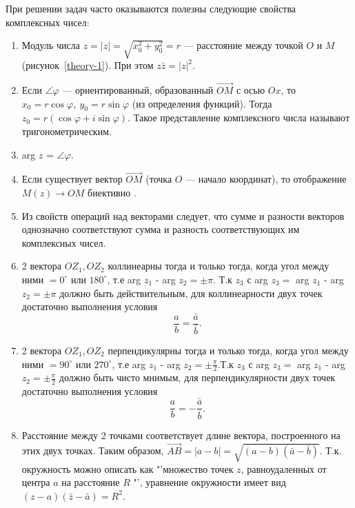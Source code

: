 При решении задач часто оказываются полезны следующие свойства комплексных чисел:
\begin{enumerate}
   \item Модуль числа $z = \vert z\vert = \sqrt{x_0^2+y_0^2} = r$ --- расстояние между точкой
         \(O\) и \(M\) (рисунок~\ref{theory-1}). При этом \(z\bar{z} = |z|^2\).
   \item Если $\angle \varphi$ --- ориентированный, образованный $\overrightarrow{OM}$
         с осью \(Ox\), то $x_0 = r\cos \varphi,~y_0 = r\sin \varphi$ (из определения функций).
         Тогда $z_0 = r(\cos \varphi + i \sin \varphi)$. Такое представление комплексного
         числа называют тригонометрическим.
   \item arg $z$ = $\angle \varphi$.
   \item Если существует вектор \(\overrightarrow{OM}\) (точка \(O\) --- начало координат),
         то отображение \(M(z) \rightarrow OM\) биективно \cite[с. 32]{book:jaglom}.
   \item Из свойств операций над векторами следует, что сумме и разности векторов однозначно
         соответствуют сумма и разность соответствующих им комплексных чисел.
   \item 2 вектора \(OZ_1,OZ_2\) коллинеарны тогда и только тогда, когда угол между ними \(= 0^\circ\)
         или \(180^\circ\), т.е arg \(z_1\) - arg \(z_2 = \pm \pi\). Т.к \(z_3\) с
         arg \(z_3 =\) arg \(z_1\) - arg \(z_2 = \pm \pi\) должно быть действительным, для
         коллинеарности двух точек достаточно выполнения условия
         \begin{equation*}
            \frac{a}{b} = \frac{\bar{a}}{\bar{b}}.
         \end{equation*}
   \item 2 вектора \(OZ_1,OZ_2\) перпендикулярны тогда и только тогда, когда угол между ними
         \(= 90^\circ\) или \(270^\circ\), т.е arg \(z_1\) - arg \(z_2 = \pm \frac{\pi}{2}\).Т.к \(z_3\) с
         arg \(z_3 =\) arg \(z_1\) - arg \(z_2 = \pm \frac{\pi}{2}\) должно быть чисто мнимым,
         для перпендикулярности двух точек достаточно выполнения условия
         \begin{equation*}
            \frac{a}{b} = -\frac{\bar{a}}{\bar{b}}.
         \end{equation*}
   \item Расстояние между 2 точками соответствует длине вектора, построенного на этих двух
         точках. Таким образом, \(\overrightarrow{AB} = |a-b| = \sqrt{(a-b)(\bar{a}-\bar{b})}\). Т.к. окружность
         можно описать как "'множество точек \(z\), равноудаленных от центра \(a\) на расстояние \(R\) "',
         уравнение окружности имеет вид \((z-a)(\bar{z}-\bar{a}) = R^2\).
         \label{theory-properties}
\end{enumerate}
